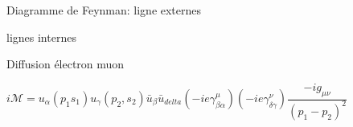 \begin{figure}[ht]
    \centering
    \caption{Diagramme de Feynman: ligne externes}
    \label{fig:diagramme-de-feynman:-qed}
\end{figure}

\begin{figure}[ht]
    \centering
    \caption{lignes internes}
    \label{fig:lignes-internes}
\end{figure}




\begin{figure}[ht]
    \centering
    \caption{Diffusion électron muon}
    \label{fig:diffusion-électron-muon}
\end{figure}

\[ i \mathcal{M} = u_{\alpha} (p_1 s_1 ) u_{\gamma} (p_2,s_2) \bar u_{\beta} \bar u_{delta} \left( -ie\gamma_{\beta\alpha}^{\mu} \right) \left( -ie \gamma_{\delta\gamma}^{\nu} \right) \frac{-ig_{\mu\nu}}{(p_{1}-p_{2})^2}    \] 




